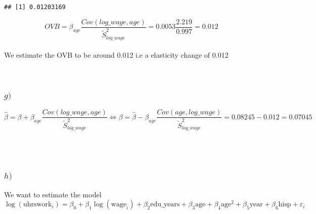 \documentclass[
]{article}
\newenvironment{Shaded}{\begin{snugshade}}{\end{snugshade}}
\newcommand{\DataTypeTok}[1]{\textcolor[rgb]{0.13,0.29,0.53}{#1}}
\newcommand{\DecValTok}[1]{\textcolor[rgb]{0.00,0.00,0.81}{#1}}
\newcommand{\KeywordTok}[1]{\textcolor[rgb]{0.13,0.29,0.53}{\textbf{#1}}}
\newcommand{\NormalTok}[1]{#1}
\newcommand{\OperatorTok}[1]{\textcolor[rgb]{0.81,0.36,0.00}{\textbf{#1}}}
\newcommand{\StringTok}[1]{\textcolor[rgb]{0.31,0.60,0.02}{#1}}
\begin{document}
\begin{verbatim}
## [1] 0.01203169
\end{verbatim}

\hfill\break
\[OVB = \beta_{age} \frac{Cov(log\_wage,age)}{\tilde{S}^2_{log\_wage}} = 0.0053 \frac{2.219}{0.997} = 0.012\]\\
We estimate the OVB to be around 0.012 i.e a elasticity change of
0.012\\
~\\
~\\

\hypertarget{g}{%
\subsubsection{\texorpdfstring{\(g)\)}{g)}}\label{g}}

\hfill\break
\[\hat{\beta} = \beta + \beta_{age} \frac{Cov(log\_wage,age)}{\tilde{S}^2_{log\_wage}} \Leftrightarrow \beta = \hat{\beta} -  \beta_{age} \frac{Cov(age,log\_wage)}{\tilde{S}^2_{log\_wage}} = 0.08245 - 0.012 = 0.07045\]\\
~\\
~\\

\hypertarget{h}{%
\subsubsection{\texorpdfstring{\(h)\)}{h)}}\label{h}}

\hfill\break
We want to estimate the model\\
\[\log(\textrm{uhrswork}_i) = \beta_0 + \beta_1 \log(\textrm{wage}_i) +\beta_2\textrm{edu_years} + \beta_3\textrm{age} + \beta_4 \textrm{age}^2 + \beta_5 \textrm{year} + \beta_6 \textrm{hisp} + \varepsilon_i\]

\begin{Shaded}
\end{Shaded}
\end{document}
